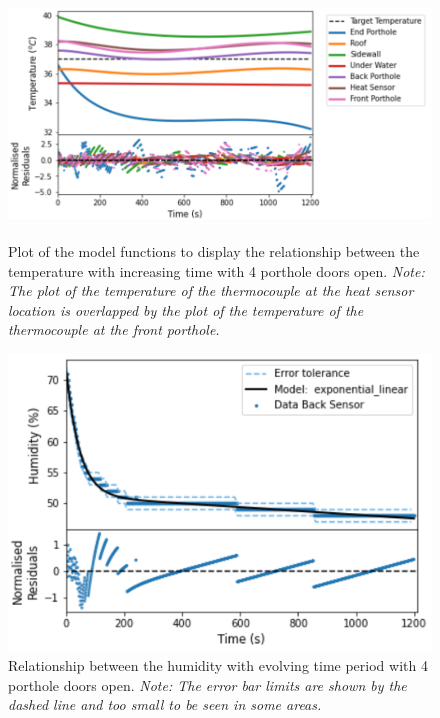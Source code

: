 \documentclass{article}
\begin{document}
\begin{figure}[H]
\centering
\begin{minipage}{0.57\linewidth}
    \captionsetup{justification=centering,margin=0.1cm}
    \includegraphics[width=\textwidth]{model functions 4 doors open.png}
    \caption{Plot of the model functions to display the relationship between the temperature with increasing time with 4 porthole doors open. \textit{Note: The plot of the temperature of the thermocouple at the heat sensor location is overlapped by the plot of the temperature of the thermocouple at the front porthole.}}
\end{minipage}
\hfill
\begin{minipage}{.42\linewidth}
    \captionsetup{justification=centering,margin=0.6cm}
    \includegraphics[width=\textwidth]{humidity 4 doors open.png}
    \caption{Relationship between the humidity with evolving time period with 4 porthole doors open. \textit{Note: The error bar limits are shown by the dashed line and too small to be seen in some areas.} }
    \end{minipage}
\end{figure}
\end{document}

